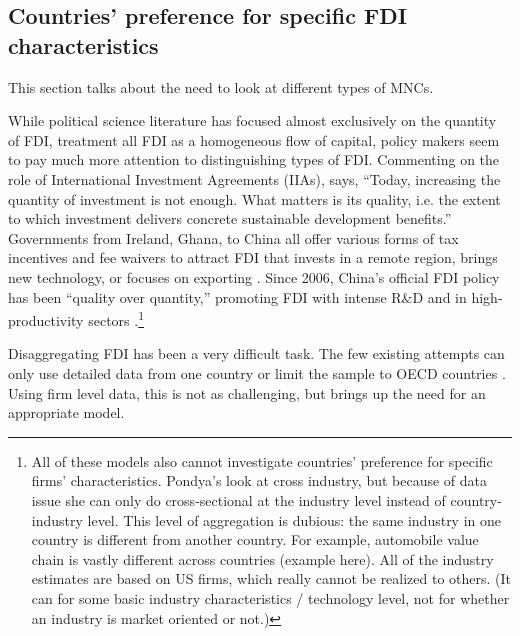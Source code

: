 \subsection{Countries' preference for specific FDI characteristics}

This section talks about the need to look at different types of MNCs.

While political science literature has focused almost exclusively on the quantity of FDI, treatment all FDI as a homogeneous flow of capital, policy makers seem to pay much more attention to distinguishing types of FDI. Commenting on the role of International Investment Agreements (IIAs), \citet{UNCTAD2015} says, ``Today, increasing the quantity of investment is not enough. What matters is its quality, i.e. the extent to which investment delivers concrete sustainable development benefits.'' Governments from Ireland, Ghana, to China all offer various forms of tax incentives and fee waivers to attract FDI that invests in a remote region, brings new technology, or focuses on exporting \citep{Ricupero2000}. Since 2006, China's official FDI policy has been ``quality over quantity,'' promoting FDI with intense R\&D and in high-productivity sectors \citep{Guangzhou2011}.\footnote{All of these models also cannot investigate countries' preference for specific firms' characteristics. Pondya's look at cross industry, but because of data issue she can only do cross-sectional at the industry level instead of country-industry level. This level of aggregation is dubious: the same industry in one country is different from another country. For example, automobile value chain is vastly different across countries (example here). All of the industry estimates are based on US firms, which really cannot be realized to others. (It can for some basic industry characteristics / technology level, not for whether an industry is market oriented or not.)}

Disaggregating FDI has been a very difficult task. The few existing attempts can only use detailed data from one country or limit the sample to OECD countries \citep{Alfaro2003, Alfaro2007, Javorcik2004}. Using firm level data, this is not as challenging, but brings up the need for an appropriate model.

